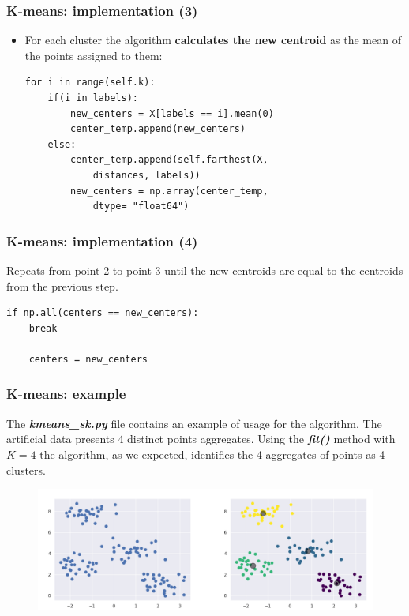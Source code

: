 \documentclass[xcolor ={table,usenames,dvipsnames}]{beamer}
\theoremstyle{definition}
\begin{document}
	\begin{frame}[fragile]
		\frametitle{K-means: implementation (3)}	
		\begin{itemize}
			\item For each cluster the algorithm \textbf{calculates the new centroid} as the mean of the points assigned to them:
			
			\begin{lstlisting}
for i in range(self.k):
	if(i in labels):
		new_centers = X[labels == i].mean(0)
		center_temp.append(new_centers)
	else:
		center_temp.append(self.farthest(X, 
			distances, labels))	
		new_centers = np.array(center_temp,
			dtype= "float64")
			\end{lstlisting}
		\end{itemize}
	\end{frame}

	\begin{frame}[fragile]
		\frametitle{K-means: implementation (4)}
		Repeats from point 2 to point 3 until the new centroids are equal to the centroids from the previous step.
		\begin{lstlisting}
if np.all(centers == new_centers):
	break
		
	centers = new_centers
		\end{lstlisting}
	\end{frame}

	\begin{frame}[fragile]
		\frametitle{K-means: example}
		The \textbf{\textit{kmeans\_sk.py}} file contains an example of usage for the algorithm. The artificial data presents 4 distinct points aggregates. Using the \textbf{\textit{fit()}} method with $K = 4$ the algorithm, as we expected, identifies the 4 aggregates of points as 4 clusters.
		
			\begin{figure}[h!]
			\centering
			\includegraphics[scale=0.3]{img/example.png}
		\end{figure}
	\end{frame}
\end{document}
